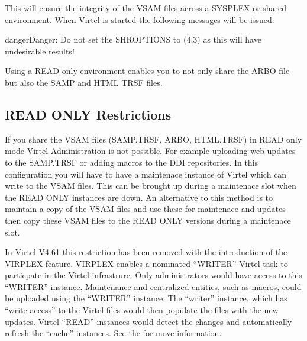 \documentclass[letterpaper,10pt,english]{sphinxmanual}
\begin{document}
\sphinxAtStartPar
This will ensure the integrity of the VSAM files across a SYSPLEX or shared environment. When Virtel is started the following messages will be issued:\sphinxhyphen{}

\begin{sphinxVerbatim}[commandchars=\\\{\}]
      
   
  
   
   
  
   
  
   
  
  
\end{sphinxVerbatim}

\begin{sphinxadmonition}{danger}{Danger:}
\sphinxAtStartPar
Do not set the SHROPTIONS to (4,3) as this will have undesirable results!
\end{sphinxadmonition}

\sphinxAtStartPar
Using a READ only environment enables you to not only share the ARBO file but also the SAMP and HTML TRSF files.


\subsection{READ ONLY Restrictions}
\label{\detokenize{connectivity_guide:read-only-restrictions}}
\sphinxAtStartPar
If you share the VSAM files (SAMP.TRSF, ARBO, HTML.TRSF) in READ only mode Virtel Administration is not possible. For example uploading web updates to the SAMP.TRSF or adding macros to the DDI repositories. In this configuration you will have to have a maintenace instance of Virtel which can write to the VSAM files. This can be brought up during a maintenace slot when the READ ONLY instances are down. An alternative to this method is to maintain a copy of the VSAM files and use these for maintenace and updates then copy these VSAM files to the READ ONLY versions during a maintenace slot.

\sphinxAtStartPar
In Virtel V4.61 this restriction has been removed with the introduction of the VIRPLEX feature. VIRPLEX enables a nominated “WRITER” Virtel task to particpate in the Virtel infrastrure. Only administrators would have access to this “WRITER” instance. Maintenance and centralized entities, such as macros, could be uploaded using the “WRITER” instance. The “writer” instance, which has “write access” to the Virtel files would then populate the files with the new updates. Virtel “READ” instances would detect the changes and automatically refresh the “cache” instances. See the {\hyperref[\detokenize{connectivity_guide:v461cn-virplex}]{}} for move information.
\end{document}
